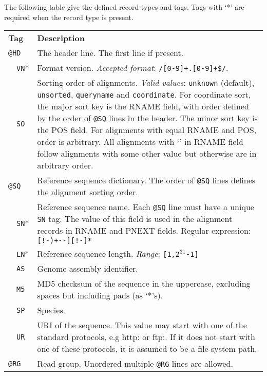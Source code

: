 \documentclass[10pt]{article}
\begin{document}
The following table give the defined record types and tags. Tags with
`*' are required when the record type is present.

\begin{center}
\small
\begin{longtable}{|l|l|p{13.5cm}|}
  \cline{1-3}
  \multicolumn{2}{|l|}{\bf Tag} & {\bf Description} \\
  \cline{1-3}
  \multicolumn{2}{|l}{\tt @HD} & The header line. The first line if present. \\\cline{2-3}
  & {\tt VN}* & Format version. \emph{Accepted format}: {\tt /\char94[0-9]+\char92.[0-9]+\$/}.\\\cline{2-3}
  & {\tt SO} & Sorting order of alignments. \emph{Valid values}: {\tt unknown} (default), {\tt
    unsorted}, {\tt queryname} and {\tt coordinate}. For coordinate sort, the major sort
  key is the {\sf RNAME} field, with order defined by the order of {\tt @SQ} lines in the header.  The
  minor sort key is the {\sf POS} field.  For alignments with equal {\sf RNAME} and {\sf POS}, order is
  arbitrary.  All alignments with `{\tt *}' in {\sf RNAME} field follow alignments with some other
  value but otherwise are in arbitrary order.\\\cline{1-3}
  \multicolumn{2}{|l}{\tt @SQ} & Reference sequence dictionary. The order of {\tt @SQ} lines defines the alignment sorting order.\\\cline{2-3}
  & {\tt SN}* & Reference sequence name. Each {\tt @SQ} line must have a unique {\tt SN} tag. The value of this
  field is used in the
  alignment records in RNAME and PNEXT fields. Regular expression: {\tt [!-)+-\char60\char62-\char126][!-\char126]*}\\\cline{2-3}
  & {\tt LN}* & Reference sequence length. \emph{Range}: {\tt [1,2$^{31}$-1]}\\\cline{2-3}
  & {\tt AS} & Genome assembly identifier. \\\cline{2-3}
  & {\tt M5} & MD5 checksum of the sequence in the uppercase, excluding spaces but including pads (as `*'s).\\\cline{2-3}
  & {\tt SP} & Species.\\\cline{2-3}
  & {\tt UR} & URI of the sequence.  This value may start with one of the standard
  protocols, e.g http: or ftp:.  If it does not start with one of these protocols, it is assumed to be a file-system path.\\\cline{1-3}
  \multicolumn{2}{|l}{\tt @RG} & Read group. Unordered multiple {\tt @RG} lines are allowed.\\\cline{2-3}

\end{longtable}
\end{center}
\end{document}
